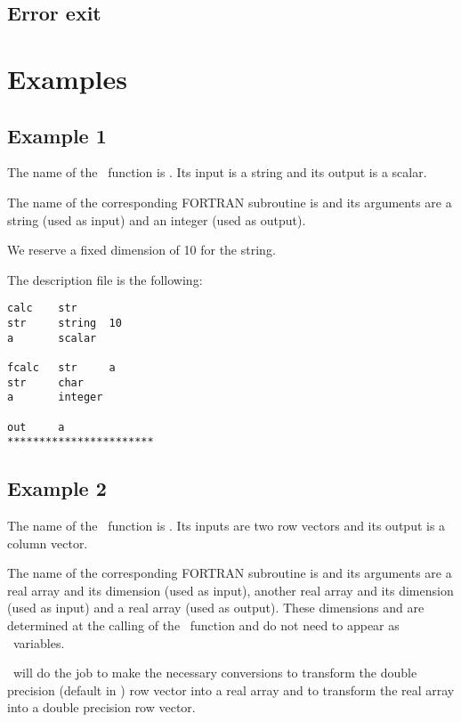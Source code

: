 \subsection{Error exit}

\section{Examples}

\subsection{Example 1}
\label{ex1}

The name of the \SCI\ function is . Its input is a string and its
output is a scalar.

The name of the corresponding FORTRAN subroutine is  and its arguments
are a string (used as input) and an integer (used as output).

We reserve a fixed dimension of 10 for the string.

The description file is the following:
\begin{verbatim}
calc    str
str     string  10
a       scalar

fcalc   str     a
str     char
a       integer

out     a
***********************
\end{verbatim}

\subsection{Example 2}
\label{ex2}

The name of the \SCI\ function is . Its inputs are two row vectors and
its  output is a column vector.

The name of the corresponding FORTRAN subroutine is  and its arguments
are a real array and its dimension (used as input), another 
real array and its dimension (used as input) and a real array (used as output).
These dimensions  and  are determined at the calling of the \SCI\
function and do not need to appear as \SCI\ variables.

\ISCI\ will do the job to make the necessary conversions to transform the
double precision (default in \SCI) row vector \T{a} into a real array and to
transform the real array \T{c} into a double precision row vector.

